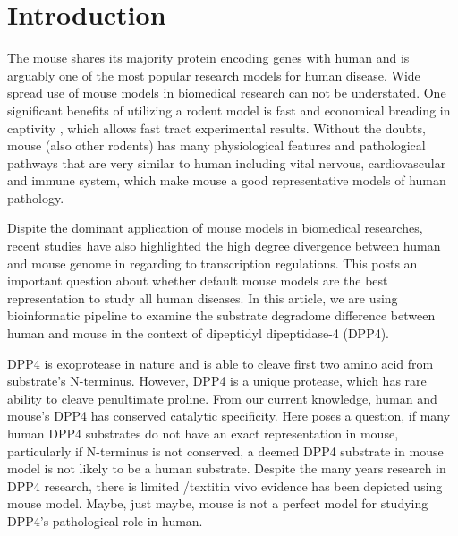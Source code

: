 \section{Introduction}

The mouse shares its majority protein encoding genes with human and is arguably one of the most popular research models for human disease. Wide spread use of mouse models in biomedical research can not be understated. \cite{MORSEIII_2007} One significant benefits of utilizing a rodent model is fast and economical breading in captivity \cite{Rosenthal_2007}, which allows fast tract experimental results. \cite{Vandamme_2014} Without the doubts, mouse (also other rodents) has many physiological features and pathological pathways that are very similar to human including vital nervous, cardiovascular and immune system, which make mouse a good representative models of human pathology. \cite{MORSEIII_2007,Rosenthal_2007}

Dispite the dominant application of mouse models in biomedical researches, recent studies have also highlighted the high degree divergence between human and mouse genome in regarding to transcription regulations. \cite{25409824} This posts an important question about whether default mouse models are the best representation to study all human diseases. In this article, we are using bioinformatic pipeline to examine the substrate degradome difference between human and mouse in the context of dipeptidyl dipeptidase-4 (DPP4).  

DPP4 is exoprotease in nature and is able to cleave first two amino acid from substrate's N-terminus. However, DPP4 is a unique protease, which has rare ability to cleave penultimate proline. From our current knowledge, human and mouse's DPP4 has conserved catalytic specificity. Here poses a question, if many human DPP4 substrates do not have an exact representation in mouse, particularly if N-terminus is not conserved, a deemed DPP4 substrate in mouse model is not likely to be a human substrate. Despite the many years research in DPP4 research, there is limited /textit{in vivo} evidence has been depicted using mouse model. Maybe, just maybe, mouse is not a perfect model for studying DPP4's pathological role in human. 

\cite{Justice_2011}
